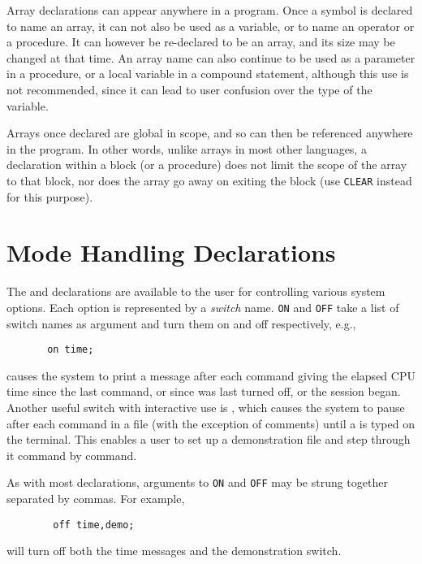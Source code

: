 Array declarations can appear anywhere in a program. Once a symbol is
declared to name an array, it can not also be used as a variable, or to
name an operator or a procedure. It can however be re-declared to be an
array, and its size may be changed at that time. An array name can also
continue to be used as a parameter in a procedure, or a local variable in
a compound statement, although this use is not recommended, since it can
lead to user confusion over the type of the variable.

Arrays once declared are global in scope, and so can then be referenced
anywhere in the program. In other words, unlike arrays in most other
languages, a declaration within a block (or a procedure) does not limit
the scope of the array to that block, nor does the array go away on
exiting the block (use \texttt{CLEAR} instead for this purpose).

\section{Mode Handling Declarations}
\hypertarget{command:ON}{}
\hypertarget{command:OFF}{}
\hypertarget{switch:TIME}{}
\hypertarget{switch:DEMO}{}

The  and  declarations are
available to the user for controlling various system options.  Each option
is represented by a \emph{switch} name. \texttt{ON} and
\texttt{OFF} take a list of switch names as argument and turn them on and off
respectively, e.g.,
\begin{verbatim}
       on time;
\end{verbatim}
causes the system to print a message after each command giving the elapsed
CPU time since the last command, or since  was
last turned off, or the session began.  Another useful switch with
interactive use is , which causes the system to
pause after each command in a file (with the exception of comments)
until a  is typed on the terminal.  This
enables a user to set up a demonstration file and step through it command
by command.

As with most declarations, arguments to \texttt{ON} and \texttt{OFF} may be
strung together separated by commas.  For example,
\begin{verbatim}
        off time,demo;
\end{verbatim}
will turn off both the time messages and the demonstration switch.

